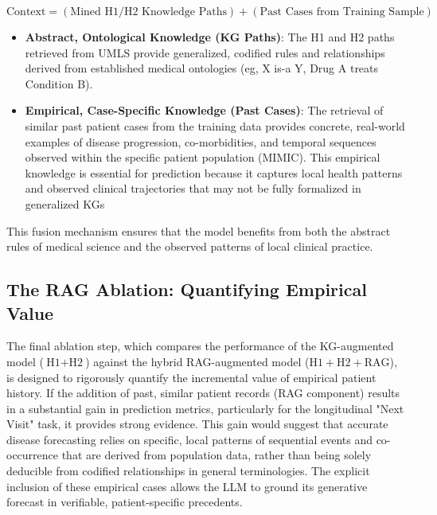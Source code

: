 $$\text{Context} = (\text{Mined H1/H2 Knowledge Paths}) + (\text{Past Cases from Training Sample})$$
\begin{itemize}
    \item \textbf{Abstract, Ontological Knowledge (KG Paths)}: The H1 and H2 paths retrieved from UMLS provide generalized, codified rules and relationships derived from established medical ontologies (eg, X is-a Y, Drug A treats Condition B).
    \item \textbf{Empirical, Case-Specific Knowledge (Past Cases)}: The retrieval of similar past patient cases from the training data provides concrete, real-world examples of disease progression, co-morbidities, and temporal sequences observed within the specific patient population (MIMIC). This empirical knowledge is essential for prediction because it captures local health patterns and observed clinical trajectories that may not be fully formalized in generalized KGs
\end{itemize}
This fusion mechanism ensures that the model benefits from both the abstract rules of medical science and the observed patterns of local clinical practice.

\subsection{The RAG Ablation: Quantifying Empirical Value}
The final ablation step, which compares the performance of the KG-augmented model ($\text{H1} + \text{H2}$) against the hybrid RAG-augmented model ($\text{H1} + \text{H2} + \text{RAG}$), is designed to rigorously quantify the incremental value of empirical patient history.
If the addition of past, similar patient records (RAG component) results in a substantial gain in prediction metrics, particularly for the longitudinal "Next Visit" task, it provides strong evidence. This gain would suggest that accurate disease forecasting relies on specific, local patterns of sequential events and co-occurrence that are derived from population data, rather than being solely deducible from codified relationships in general terminologies. The explicit inclusion of these empirical cases allows the LLM to ground its generative forecast in verifiable, patient-specific precedents.



